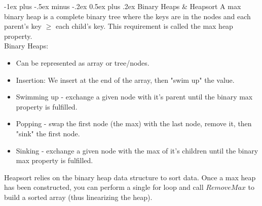 \documentclass[letterpaper, 8pt]{extarticle}
\makeatletter
\renewcommand{\section}{\@startsection{section}{1}{0mm}%
                                {-1ex plus -.5ex minus -.2ex}%
                                {0.5ex plus .2ex}%
                                {\normalfont\normalsize\bfseries}}
\makeatother
\begin{document}
\begin{multicols*}{4}
    \section{Binary Heaps \& Heapsort}
    A max binary heap is a complete binary tree where the keys are in the nodes and each parent's key $\geq$ each child's key. This requirement is called the max heap property.
    \\
    Binary Heaps:
    \begin{itemize}
        \item Can be represented as array or tree/nodes.
        \item Insertion: We insert at the end of the array, then "swim up" the value.
        \item Swimming up - exchange a given node with it's parent until the binary max property is fulfilled.
        \item Popping - swap the first node (the max) with the last node, remove it, then "sink" the first node.
        \item Sinking - exchange a given node with the max of it's children until the binary max property is fulfilled.
    \end{itemize}

    Heapsort relies on the binary heap data structure to sort data. Once a max heap has been constructed, you can perform a single for loop and call $RemoveMax$ to build a sorted array (thus linearizing the heap).

\end{multicols*}
\end{document}
